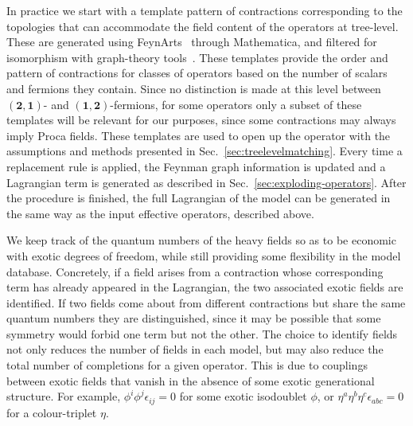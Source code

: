 In practice we start with a template pattern of contractions corresponding to
the topologies that can accommodate the field content of the operators at
tree-level. These are generated using \textsf{FeynArts}~\cite{Hahn:2000kx}
through \textsf{Mathematica}, and filtered for isomorphism with graph-theory
tools~\cite{igraph2006, the_igraph_core_team_2020_3774399,
  szabolcs_horvat_2020_3739056, SciPyProceedings_11}. These templates provide
the order and pattern of contractions for classes of operators based on the
number of scalars and fermions they contain. Since no distinction is made at
this level between $(\mathbf{2}, \mathbf{1})$- and
$(\mathbf{1}, \mathbf{2})$-fermions, for some operators only a subset of these
templates will be relevant for our purposes, since some contractions may always
imply Proca fields. These templates are used to open up the operator with the
assumptions and methods presented in Sec.~\ref{sec:treelevelmatching}. Every
time a replacement rule is applied, the Feynman graph information is updated and
a Lagrangian term is generated as described in
Sec.~\ref{sec:exploding-operators}. After the procedure is finished, the full
Lagrangian of the model can be generated in the same way as the input effective
operators, described above.

We keep track of the quantum numbers of the heavy fields so as to be economic
with exotic degrees of freedom, while still providing some flexibility in the
model database. Concretely, if a field arises from a contraction whose
corresponding term has already appeared in the Lagrangian, the two associated
exotic fields are identified. If two fields come about from different
contractions but share the same quantum numbers they are distinguished, since it
may be possible that some symmetry would forbid one term but not the other. The
choice to identify fields not only reduces the number of fields in each model,
but may also reduce the total number of completions for a given operator. This
is due to couplings between exotic fields that vanish in the absence of some
exotic generational structure. For example,
$\phi^{i} \phi^{j} \epsilon_{ij} = 0$ for some exotic isodoublet $\phi$, or
$\eta^{a} \eta^{b} \eta^{c} \epsilon_{abc} = 0$ for a colour-triplet $\eta$.


